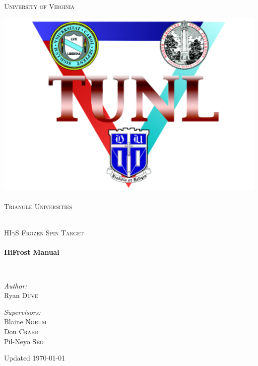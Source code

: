 \begin{titlepage}
\begin{center}
\begin{minipage}{.48\textwidth}
\textsc{\normalsize University of Virginia}\\[1.5cm]
\end{minipage}
\hfill
\noindent\begin{minipage}{.25\textwidth}
\centering
\includegraphics[width=\linewidth]{./img/tunl-logo.png}~\\[.5cm]
\textsc{\normalsize Triangle Universities}\\[1.5cm]
\end{minipage}
\\[80pt]
\textsc{\Large HI$\gamma$S Frozen Spin Target}\\[0.5cm]

\HRule \\[0.4cm]
{ \huge \bfseries HiFrost Manual \\[0.4cm] }

\HRule \\[1.5cm]

\begin{minipage}{0.4\textwidth}
\begin{flushleft} \large
\emph{Author:}\\
Ryan \textsc{Duve}
\end{flushleft}
\end{minipage}
\begin{minipage}{0.4\textwidth}
\begin{flushright} \large
\emph{Supervisors:} \\
Blaine \textsc{Norum} \\
Don \textsc{Crabb} \\
Pil-Neyo \textsc{Seo}
\end{flushright}
\end{minipage}

\vfill

{\large Updated \today}

\end{center}
\end{titlepage}